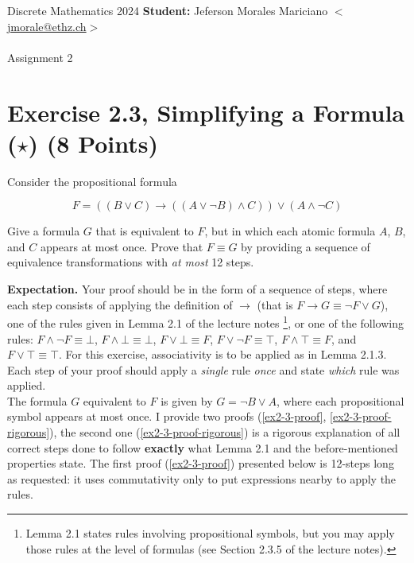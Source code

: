 \documentclass[unicode,11pt,a4paper,oneside,numbers=endperiod,openany]{scrartcl}
\begin{document}
\setassignment
{}

\serieheader
{Discrete Mathematics}
{2024}
{%
\textbf{Student:} Jeferson Morales Mariciano 
\href{mailto:jmorale@ethz.ch}{\(<\)jmorale@ethz.ch\(>\)} \\\\}
{\vspace{-1cm}}%
{Assignment 2}{}

\section*{Exercise 2.3, Simplifying a Formula (\(\star\)) \hfill (8 Points)}

Consider the propositional formula

\[
F = \left( (B \lor C) \to ((A \lor \neg B) \land C) \right) \lor (A \land \neg C)
\]

\noindent Give a formula \( G \) that is equivalent to \( F \), but in which each atomic formula \( A \), \( B \), and \( C \)
appears at most once. Prove that \( F \equiv G \) by providing a sequence of equivalence transformations 
with \textit{at most} 12 steps.

\noindent \textbf{Expectation.} 
Your proof should be in the form of a sequence of steps, where each step
consists of applying the definition of \( \to \) 
(that is \( F \to G \equiv \neg F \lor G \)), 
one of the rules given in Lemma 2.1 of the lecture notes 
\footnote{Lemma 2.1 states rules involving propositional symbols, 
but you may apply those rules at the level of formulas 
(see Section 2.3.5 of the lecture notes).}, 
or one of the following rules: 
\( F \land \neg F \equiv \bot \), 
\( F \land \bot \equiv \bot \), 
\( F \lor \bot \equiv F \), 
\( F \lor \neg F \equiv \top \), 
\( F \land \top \equiv F \), 
and \( F \lor \top \equiv \top \). 
For this exercise, associativity is to be applied as in Lemma 2.1.3. 
Each step of your proof should apply a \textit{single} rule \textit{once} 
and state \textit{which} rule was applied.
\\

The formula \( G \) equivalent to \( F \) is given by \( G = \neg B \lor A \), 
where each propositional symbol appears at most once.
I provide two proofs (\ref{ex2-3-proof}, \ref{ex2-3-proof-rigorous}), 
the second one (\ref{ex2-3-proof-rigorous}) is a rigorous explanation of all correct steps done to follow
\textbf{exactly} what Lemma 2.1 and the before-mentioned properties state. 
The first proof (\ref{ex2-3-proof}) presented below is 12-steps long as requested: 
it uses commutativity only to put expressions nearby to apply the rules. 
\end{document}
